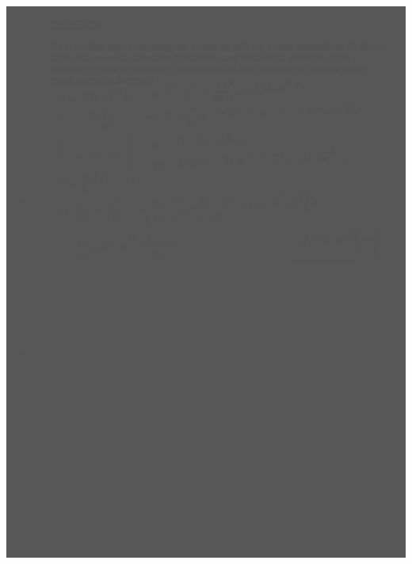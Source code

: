 {{{\includegraphics[width=17.498cm,height=24.13cm]{Pictures/10000001000002570000033B834634AAD14CB84E.png}

}}}
